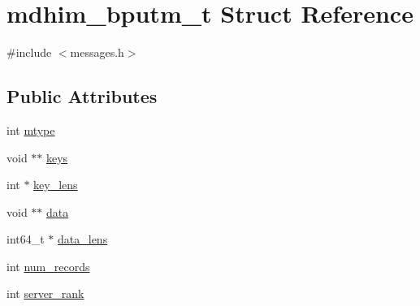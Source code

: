 \hypertarget{structmdhim__bputm__t}{\section{mdhim\-\_\-bputm\-\_\-t Struct Reference}
\label{d1/ddf/structmdhim__bputm__t}
}


{\ttfamily \#include $<$messages.\-h$>$}

\subsection*{Public Attributes}
\begin{DoxyCompactItemize}
\item 
int \hyperlink{structmdhim__bputm__t_a84865663becc6cfd06c5c7667b37244d}{mtype}
\item 
void $\ast$$\ast$ \hyperlink{structmdhim__bputm__t_a6cd17a8565bb662fdb1d52d878ce2a3d}{keys}
\item 
int $\ast$ \hyperlink{structmdhim__bputm__t_a528ae69dc41eab9b8e8d523d67debeac}{key\-\_\-lens}
\item 
void $\ast$$\ast$ \hyperlink{structmdhim__bputm__t_aeca654729127b0dfdaaee05ede56fabe}{data}
\item 
int64\-\_\-t $\ast$ \hyperlink{structmdhim__bputm__t_a98c305f7412151649471b47fbc731018}{data\-\_\-lens}
\item 
int \hyperlink{structmdhim__bputm__t_ad075b00254b3f26231b57134995d017b}{num\-\_\-records}
\item 
int \hyperlink{structmdhim__bputm__t_afd28a1e8797725473429ebed5ccc6800}{server\-\_\-rank}
\end{DoxyCompactItemize}


